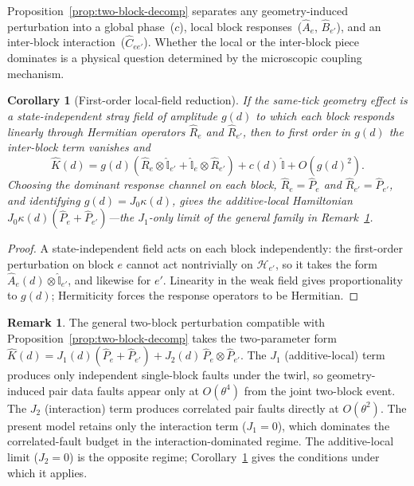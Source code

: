 \documentclass[
aps,
prx,
10pt,
twocolumn,
groupedaddress,
longbibliography,
nofootinbib,
floatfix
]{revtex4-2}
\newtheorem{corollary}{Corollary}
\theoremstyle{definition}
\newtheorem{remark}{Remark}
\newcommand{\I}{\hat{\mathbb{I}}}
\begin{document}
Proposition~\ref{prop:two-block-decomp} separates any geometry-induced perturbation into a global phase~($c$), local block responses~($\hat A_e$, $\hat B_{e'}$), and an inter-block interaction~($\hat C_{ee'}$). Whether the local or the inter-block piece dominates is a physical question determined by the microscopic coupling mechanism.

\begin{corollary}[First-order local-field reduction]
\label{cor:local-field}
If the same-tick geometry effect is a state-independent stray field of amplitude $g(d)$ to which each block responds linearly through Hermitian operators $\hat R_e$ and $\hat R_{e'}$, then to first order in $g(d)$ the inter-block term vanishes and
\begin{equation}
\hat K(d)=g(d)\!\left(\hat R_e\otimes\I_{e'}+\I_e\otimes\hat R_{e'}\right)+c(d)\,\I+O\!\left(g(d)^2\right).
\label{eq:local-field}
\end{equation}
Choosing the dominant response channel on each block, $\hat R_e=\hat P_e$ and $\hat R_{e'}=\hat P_{e'}$, and identifying $g(d)=J_0\kappa(d)$, gives the additive-local Hamiltonian $J_0\kappa(d)(\hat P_e+\hat P_{e'})$---the $J_1$-only limit of the general family in Remark~\ref{rem:general-family}.
\end{corollary}

\begin{proof}
A state-independent field acts on each block independently: the first-order perturbation on block $e$ cannot act nontrivially on $\mathcal{H}_{e'}$, so it takes the form $\hat A_e(d)\otimes\I_{e'}$, and likewise for $e'$. Linearity in the weak field gives proportionality to $g(d)$; Hermiticity forces the response operators to be Hermitian.
\end{proof}

\begin{remark}
\label{rem:general-family}
The general two-block perturbation compatible with Proposition~\ref{prop:two-block-decomp} takes the two-parameter form $\hat K(d)=J_1(d)(\hat P_e+\hat P_{e'})+J_2(d)\,\hat P_e\otimes\hat P_{e'}$. The $J_1$ (additive-local) term produces only independent single-block faults under the twirl, so geometry-induced pair data faults appear only at $O(\theta^4)$ from the joint two-block event. The $J_2$ (interaction) term produces correlated pair faults directly at $O(\theta^2)$. The present model retains only the interaction term ($J_1=0$), which dominates the correlated-fault budget in the interaction-dominated regime. The additive-local limit ($J_2=0$) is the opposite regime; Corollary~\ref{cor:local-field} gives the conditions under which it applies.
\end{remark}
\end{document}
